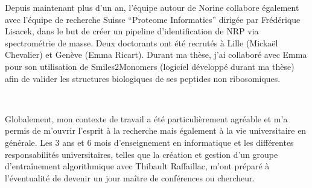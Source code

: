 Depuis maintenant plus d'un an, l'équipe autour de Norine collabore également avec l'équipe de recherche Suisse ``Proteome Informatics'' dirigée par Frédérique Lisacek, dans le but de créer un pipeline d'identification de NRP via spectrométrie de masse.
Deux doctorants ont été recrutés à Lille (Mickaël Chevalier) et Genève (Emma Ricart).
Durant ma thèse, j'ai collaboré avec Emma pour son utilisation de Smiles2Monomers (logiciel développé durant ma thèse) afin de valider les structures biologiques de ses peptides non ribosomiques.

~~

Globalement, mon contexte de travail a été particulièrement agréable et m'a permis de m'ouvrir l'esprit à la recherche mais également à la vie universitaire en générale.
Les 3 ans et 6 mois d'enseignement en informatique et les différentes responsabilités universitaires, telles que la création et gestion d'un groupe d’entraînement algorithmique avec Thibault Raffaillac, m'ont préparé à l'éventualité de devenir un jour maître de conférences ou chercheur.



























